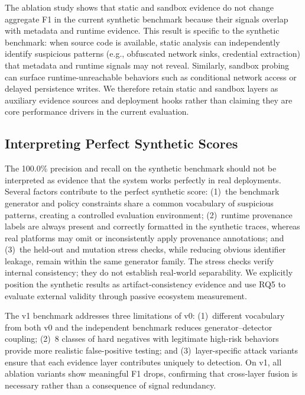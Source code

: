 \documentclass[10pt]{article}
\begin{document}
The ablation study shows that static and sandbox evidence do not change
aggregate F1 in the current synthetic benchmark because their signals overlap
with metadata and runtime evidence. This result is specific to the synthetic
benchmark: when source code is available, static analysis can independently
identify suspicious patterns (e.g., obfuscated network sinks, credential
extraction) that metadata and runtime signals may not reveal. Similarly,
sandbox probing can surface runtime-unreachable behaviors such as conditional
network access or delayed persistence writes. We therefore retain static and
sandbox layers as auxiliary evidence sources and deployment hooks rather than
claiming they are core performance drivers in the current evaluation.

\subsection{Interpreting Perfect Synthetic Scores}

The 100.0\% precision and recall on the synthetic benchmark should not be
interpreted as evidence that the system works perfectly in real deployments.
Several factors contribute to the perfect synthetic score: (1)~the benchmark
generator and policy constraints share a common vocabulary of suspicious
patterns, creating a controlled evaluation environment; (2)~runtime provenance
labels are always present and correctly formatted in the synthetic traces,
whereas real platforms may omit or inconsistently apply provenance annotations;
and (3)~the held-out and mutation stress checks, while reducing obvious
identifier leakage, remain within the same generator family. The stress checks
verify internal consistency; they do not establish real-world separability. We
explicitly position the synthetic results as artifact-consistency evidence and
use RQ5 to evaluate external validity through passive ecosystem measurement.

The v1 benchmark addresses three limitations of v0: (1)~different vocabulary
from both v0 and the independent benchmark reduces generator--detector
coupling; (2)~8 classes of hard negatives with legitimate high-risk behaviors
provide more realistic false-positive testing; and (3)~layer-specific attack
variants ensure that each evidence layer contributes uniquely to detection. On
v1, all ablation variants show meaningful F1 drops, confirming that
cross-layer fusion is necessary rather than a consequence of signal redundancy.
\end{document}
